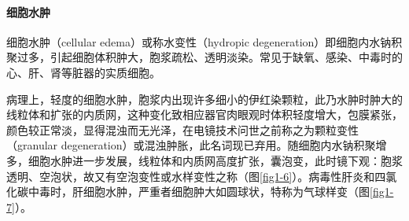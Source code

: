 \paragraph{细胞水肿}
细胞水肿（cellular edema）或称水变性（hydropic
degeneration）即细胞内水钠积聚过多，引起细胞体积肿大，胞浆疏松、透明淡染。常见于缺氧、感染、中毒时的心、肝、肾等脏器的实质细胞。

病理上，轻度的细胞水肿，胞浆内出现许多细小的伊红染颗粒，此乃水肿时肿大的线粒体和扩张的内质网，这种变化致相应器官肉眼观时体积轻度增大，包膜紧张，颜色较正常淡，显得混浊而无光泽，在电镜技术问世之前称之为颗粒变性（granular
degeneration）或混浊肿胀，此名词现已弃用。随细胞内水钠积聚增多，细胞水肿进一步发展，线粒体和内质网高度扩张，囊泡变，此时镜下观：胞浆透明、空泡状，故又有空泡变性或水样变性之称（图\ref{fig1-6}）。病毒性肝炎和四氯化碳中毒时，肝细胞水肿，严重者细胞肿大如圆球状，特称为气球样变（图\ref{fig1-7}）。
